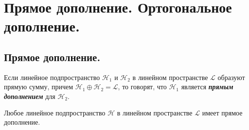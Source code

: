 \section{
    Прямое дополнение. Ортогональное дополнение.
}

\subsection{
    Прямое дополнение.
}

\begin{definition}
    Если линейное подпространство $\mathcal{H}_1$ и $\mathcal{H}_2$ в линейном пространстве $\mathcal{L}$ образуют прямую сумму, причем $\mathcal{H}_1 \oplus \mathcal{H}_2 = \mathcal{L}$, то говорят, что $\mathcal{H}_1$ является \textit{\textbf{прямым дополнением}} для $\mathcal{H}_2$.
\end{definition}

\begin{theorem}
    Любое линейное подпространство $\mathcal{H}$ в линейном пространстве $\mathcal{L}$ имеет прямое дополнение.
\end{theorem}

